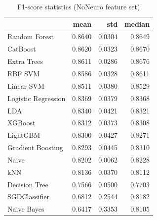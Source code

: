 \begin{table}
\caption{F1-score statistics (NoNeuro feature set)}
\label{tab:f1_NoNeuro_stats}
\begin{tabular}{lrrr}
\toprule
 & mean & std & median \\
\midrule
Random Forest & 0.8640 & 0.0304 & 0.8649 \\
CatBoost & 0.8620 & 0.0323 & 0.8670 \\
Extra Trees & 0.8611 & 0.0286 & 0.8676 \\
RBF SVM & 0.8586 & 0.0328 & 0.8611 \\
Linear SVM & 0.8511 & 0.0380 & 0.8529 \\
Logistic Regression & 0.8369 & 0.0379 & 0.8368 \\
LDA & 0.8340 & 0.0421 & 0.8321 \\
XGBoost & 0.8312 & 0.0373 & 0.8308 \\
LightGBM & 0.8300 & 0.0427 & 0.8271 \\
Gradient Boosting & 0.8293 & 0.0445 & 0.8310 \\
Naive & 0.8202 & 0.0062 & 0.8228 \\
kNN & 0.8136 & 0.0370 & 0.8112 \\
Decision Tree & 0.7566 & 0.0500 & 0.7703 \\
SGDClassifier & 0.6812 & 0.2544 & 0.8182 \\
Naive Bayes & 0.6417 & 0.3353 & 0.8105 \\
\bottomrule
\end{tabular}
\end{table}
